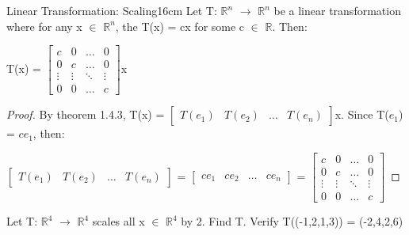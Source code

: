     \vspace{0.5cm}



    \begin{corollary}{Linear Transformation: Scaling}{16cm}
        Let T: $\mathbb{R}^n$ $\rightarrow$ $\mathbb{R}^n$
        be a linear transformation where for any x $\in$ $\mathbb{R}^n$,
        the T(x) = cx for some c $\in$ $\mathbb{R}$. Then:

        \hspace{0.5cm}
        T(x) =
        $\begin{bmatrix}
            c & 0 & \hdots & 0 \\
            0 & c & \hdots & 0 \\
            \vdots & \vdots & \ddots & \vdots \\
            0 & 0 & \hdots & c
        \end{bmatrix}$x
    \end{corollary}

    \begin{proof}
        By {\color{red} theorem 1.4.3},
        T(x) =
        $\begin{bmatrix}
            T(e_1) & T(e_2) & \hdots & T(e_n)
        \end{bmatrix}$x.
        Since T($e_1$) = $ce_1$, then:

        \hspace{0.5cm}
        $\begin{bmatrix}
            T(e_1) & T(e_2) & \hdots & T(e_n)
        \end{bmatrix}$ =
        $\begin{bmatrix}
            ce_1 & ce_2 & \hdots & ce_n
        \end{bmatrix}$ =
        $\begin{bmatrix}
            c & 0 & \hdots & 0 \\
            0 & c & \hdots & 0 \\
            \vdots & \vdots & \ddots & \vdots \\
            0 & 0 & \hdots & c
        \end{bmatrix}$
    \end{proof}

    \vspace{0.5cm}



    \begin{example}
        Let T: $\mathbb{R}^4$ $\rightarrow$ $\mathbb{R}^4$
        scales all x $\in$ $\mathbb{R}^4$ by 2. Find T.
        Verify T((-1,2,1,3)) = (-2,4,2,6)       
    \end{example}

